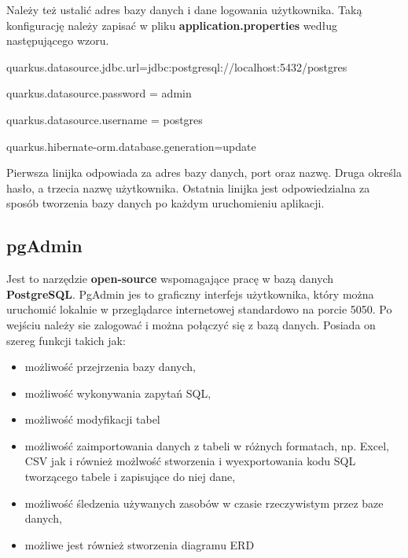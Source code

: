\documentclass{iiuwb}
\begin{document}
Należy też ustalić adres bazy danych i dane logowania użytkownika. Taką konfigurację należy zapisać w pliku \textbf{application.properties} według następującego wzoru.\newline

quarkus.datasource.jdbc.url=jdbc:postgresql://localhost:5432/postgres

quarkus.datasource.password = admin

quarkus.datasource.username = postgres

quarkus.hibernate-orm.database.generation=update\newline

Pierwsza linijka odpowiada za adres bazy danych, port oraz nazwę. Druga określa hasło, a trzecia nazwę użytkownika. Ostatnia linijka jest odpowiedzialna za sposób tworzenia bazy danych po każdym uruchomieniu aplikacji.

\subsection{pgAdmin}
\label{sec:pgAdmin}

Jest to narzędzie \textbf{open-source} wspomagające pracę w bazą danych \textbf{PostgreSQL}. PgAdmin jes to graficzny interfejs użytkownika, który można uruchomić lokalnie w przeglądarce internetowej standardowo na porcie 5050. Po wejściu należy sie zalogować i można połączyć się z bazą danych. Posiada on szereg funkcji takich jak: 

\begin{itemize}
    \item możliwość przejrzenia bazy danych,
    \item możliwość wykonywania zapytań SQL,
    \item możliwość modyfikacji tabel
    \item możliwość zaimportowania danych z tabeli 
    w różnych formatach, np. Excel, CSV jak i również 
    możlwość stworzenia i wyexportowania kodu SQL 
    tworzącego tabele i zapisujące do niej dane,
    \item możliwość śledzenia używanych zasobów w czasie rzeczywistym przez baze danych,
    \item możliwe jest również stworzenia diagramu ERD
\end{itemize}
\end{document}
